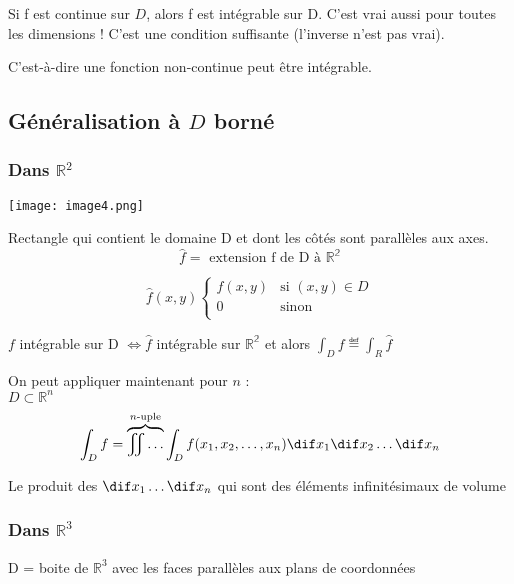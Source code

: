\begin{mytheo}

Si f est continue sur $D$, alors f est intégrable sur D. C'est vrai aussi pour toutes les dimensions ! C'est une condition suffisante (l'inverse n'est pas vrai).

C'est-à-dire une fonction non-continue peut être intégrable.

\end{mytheo}

\subsection{ Généralisation à $D$ borné }

\subsubsection{ Dans $ \mathbb{R}^2$ }

\texttt{[image: image4.png]}

Rectangle qui contient le domaine D et dont les côtés sont parallèles aux axes.
\[\hat{f} = \text{ extension f de D à } \mathbb{R^2}\]

\[
\hat{f}(x,y)
\begin{cases}
f(x, y) & \text{si } (x, y) \in D \\
0 & \text{sinon} \\
\end{cases}%
\]

$f$ intégrable sur D $ \Longleftrightarrow \hat{f}$ intégrable sur $\mathbb{R^2}$ et alors
$\int_D f \eqdef \int_R \hat{f} $


On peut appliquer maintenant pour $n$ :
\\
$ D \subset \mathbb{R}^n$
$$\int_D f = \overbrace{\iint \dots}^\text{$n$-uple} \int_D f(x_1,x_2,\dots,x_n) \dif x_1 \dif x_2 \dots \dif x_n $$

Le produit des $\dif x_1 \dots \dif x_n $ qui sont des éléments infinitésimaux de volume

\subsubsection{Dans $\mathbb{R}^3$}

D = boite de $\mathbb{R}^3$ avec les faces parallèles aux plans de coordonnées\\

